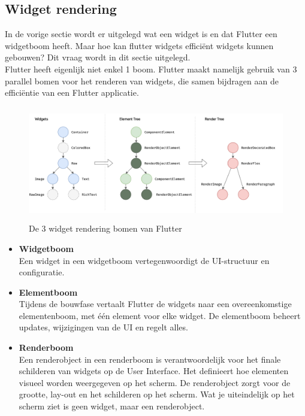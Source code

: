 \subsection[Widget rendering]{Widget rendering}
\label{sec:Widget rendering}
In de vorige sectie wordt er uitgelegd wat een widget is en dat Flutter een widgetboom heeft. Maar hoe kan flutter widgets efficiënt  widgets kunnen gebouwen? Dit vraag wordt in dit sectie uitgelegd.
\\
Flutter heeft eigenlijk niet enkel 1 boom. Flutter maakt namelijk gebruik van 3 parallel bomen voor het renderen van widgets, die samen bijdragen aan de efficiëntie van een Flutter applicatie. \autocite{adnan2023}
\begin{figure}[h]
    \centering
    \includegraphics[height=5cm, keepaspectratio]{graphics/trees.png}
    \caption{De 3 widget rendering bomen van Flutter \autocite{flutter2023} }
\end{figure}
\begin{itemize}
    \item \textbf{Widgetboom} 
    \\
    Een widget in een widgetboom vertegenwoordigt de UI-structuur en configuratie.
    \item \textbf{Elementboom} 
   \\
    Tijdens de bouwfase vertaalt Flutter de widgets naar een overeenkomstige elementenboom, met één element voor elke widget. De elementboom beheert updates, wijzigingen van de UI en regelt alles.
   \item \textbf{Renderboom} 
   \\
    Een renderobject in een renderboom is verantwoordelijk voor het finale schilderen van widgets op de User Interface. Het definieert hoe elementen visueel worden weergegeven op het scherm. 
    De renderobject zorgt voor de grootte, lay-out en het schilderen op het scherm. Wat je uiteindelijk op het scherm ziet is geen widget, maar een renderobject.
\end{itemize}



